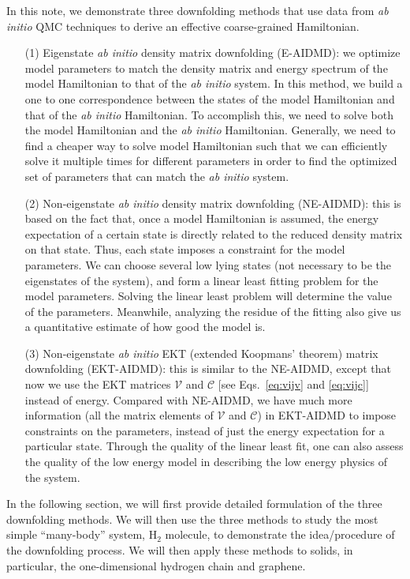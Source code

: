 \documentclass[aps, prb]{revtex4-1}
\begin{document}
In this note, we demonstrate three downfolding methods that use data from {\it ab initio} QMC techniques to derive an effective coarse-grained Hamiltonian.
\begin{itemize}
\item [(1)] Eigenstate {\it ab initio} density matrix downfolding (E-AIDMD): we optimize model parameters to match the density matrix and energy spectrum of the model Hamiltonian to that of the {\it ab initio} system. In this method, we build a one to one correspondence between the states of the model Hamiltonian and that of the \textit{ab initio} Hamiltonian. To accomplish this, we need to solve both the model Hamiltonian and the \textit{ab initio} Hamiltonian. Generally, we need to find a cheaper way to solve model Hamiltonian such that we can efficiently solve it multiple times for different parameters in order to find the optimized set of parameters that can match the \textit{ab initio} system. 
\item [(2)] Non-eigenstate {\it ab initio} density matrix downfolding (NE-AIDMD): this is based on the fact that, once a model Hamiltonian is assumed, the energy expectation  of a certain state is directly related to the reduced density matrix on that state. Thus, each state imposes a constraint for the model parameters. We can choose several low lying states (not necessary to be the eigenstates of the system), and form a linear least fitting problem for the model parameters. Solving the linear least problem will determine the value of the parameters. Meanwhile, analyzing the residue of the fitting also give us a quantitative estimate of how good the model is.
\item [(3)] Non-eigenstate {\it ab initio} EKT (extended Koopmans' theorem) matrix downfolding (EKT-AIDMD): this is similar to the NE-AIDMD, except that now we use the EKT matrices $\mathcal{V}$ and $\mathcal{C}$ [see Eqs.~\eqref{eq:vijv} and \eqref{eq:vijc}] instead of energy. Compared with NE-AIDMD, we have much more information (all the matrix elements of $\mathcal{V}$ and $\mathcal{C}$) in EKT-AIDMD to impose constraints on the parameters, instead of just the energy expectation for a particular state. Through the quality of the linear least fit, one can also assess the quality of the low energy model in describing the low energy physics of the system. 
\end{itemize}

In the following section, we will first provide detailed formulation of the three downfolding methods. We will then use the three methods to study the most simple ``many-body'' system, H$_{2}$ molecule, to demonstrate the idea/procedure of the downfolding process. We will then apply these methods to solids, in particular, the one-dimensional hydrogen chain and graphene. 
\end{document}
